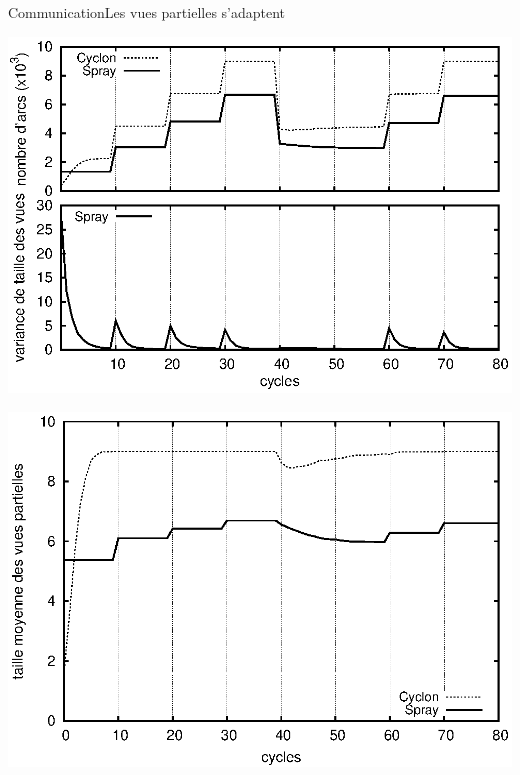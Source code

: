 \begin{frame}{Communication}{Les vues partielles s'adaptent}
  \hspace{-1cm}
  \begin{minipage}{0.47\textwidth}
    \begin{center}
      \includegraphics[width=1.23\textwidth]{img/network/churn.eps}
    \end{center}
  \end{minipage}
  \hfill
  \begin{minipage}{0.47\textwidth}
      \includegraphics[width=1.23\textwidth]{img/network/avgpv.eps}
  \end{minipage}
\end{frame}


